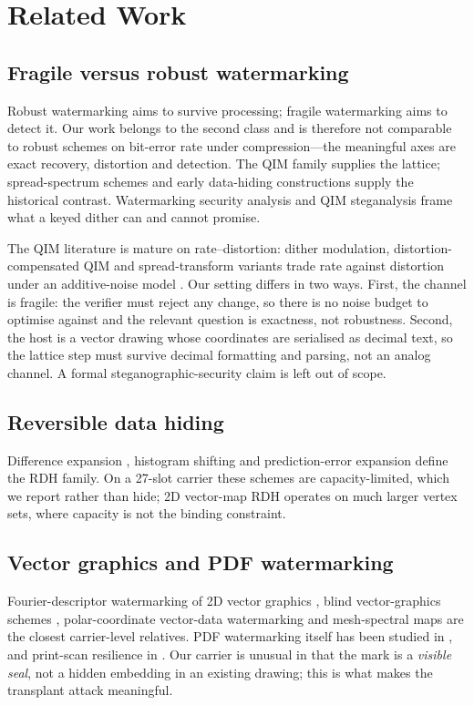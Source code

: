 \documentclass[journal]{IEEEtran}
\begin{document}
\section{Related Work}\label{sec:related}
\subsection{Fragile versus robust watermarking}
Robust watermarking aims to survive processing; fragile watermarking aims to detect it. Our work belongs to the second class and is therefore not comparable to robust schemes on bit-error rate under compression---the meaningful axes are exact recovery, distortion and detection. The QIM family \cite{chen2001,eggers2003,perez2004} supplies the lattice; spread-spectrum schemes \cite{cox1997} and early data-hiding constructions \cite{bender1996} supply the historical contrast. Watermarking security analysis \cite{cayre2005} and QIM steganalysis \cite{yang2018} frame what a keyed dither can and cannot promise.

The QIM literature is mature on rate--distortion: dither modulation, distortion-compensated QIM and spread-transform variants trade rate against distortion under an additive-noise model \cite{chen2001,eggers2003}. Our setting differs in two ways. First, the channel is fragile: the verifier must reject any change, so there is no noise budget to optimise against and the relevant question is exactness, not robustness. Second, the host is a vector drawing whose coordinates are serialised as decimal text, so the lattice step must survive decimal formatting and parsing, not an analog channel. A formal steganographic-security claim is left out of scope.

\subsection{Reversible data hiding}
Difference expansion \cite{tian2003}, histogram shifting \cite{ni2006} and prediction-error expansion \cite{thodi2007} define the RDH family. On a 27-slot carrier these schemes are capacity-limited, which we report rather than hide; 2D vector-map RDH \cite{wang2014,peng2019} operates on much larger vertex sets, where capacity is not the binding constraint.

\subsection{Vector graphics and PDF watermarking}
Fourier-descriptor watermarking of 2D vector graphics \cite{doncel2007}, blind vector-graphics schemes \cite{li2003,hou2014}, polar-coordinate vector-data watermarking \cite{mouhamed2012} and mesh-spectral maps \cite{ohbuchi2003} are the closest carrier-level relatives. PDF watermarking itself has been studied in \cite{hatoum2018}, and print-scan resilience in \cite{he2005}. Our carrier is unusual in that the mark is a \emph{visible seal}, not a hidden embedding in an existing drawing; this is what makes the transplant attack meaningful.
\end{document}
